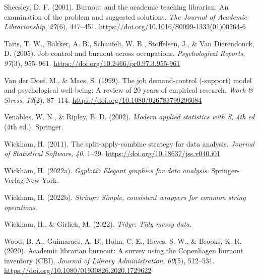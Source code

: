 \documentclass[
  twocolumn]{article}
\newlength{\cslhangindent}
\newenvironment{CSLReferences}[2] %
 {\begin{list}{}{%
  \setlength{\itemindent}{0pt}
  \setlength{\leftmargin}{0pt}
  \setlength{\parsep}{0pt}
  \ifodd #1
   \setlength{\leftmargin}{\cslhangindent}
   \setlength{\itemindent}{-1\cslhangindent}
  \fi
  \setlength{\itemsep}{#2\baselineskip}}}
 {\end{list}}
\begin{document}
\begin{CSLReferences}{1}{0}
Sheesley, D. F. (2001). Burnout and the academic teaching librarian: An
examination of the problem and suggested solutions. \emph{The Journal of
Academic Librarianship}, \emph{27}(6), 447--451.
\url{https://doi.org/10.1016/S0099-1333(01)00264-6}

Taris, T. W., Bakker, A. B., Schaufeli, W. B., Stoffelsen, J., \& Van
Dierendonck, D. (2005). Job control and burnout across occupations.
\emph{Psychological Reports}, \emph{97}(3), 955--961.
\url{https://doi.org/10.2466/pr0.97.3.955-961}

Van der Doef, M., \& Maes, S. (1999). The job demand-control (-support)
model and psychological well-being: A review of 20 years of empirical
research. \emph{Work \& Stress}, \emph{13}(2), 87--114.
\url{https://doi.org/10.1080/026783799296084}

Venables, W. N., \& Ripley, B. D. (2002). \emph{Modern applied
statistics with {S}, 4th ed} (4th ed.). Springer.

Wickham, H. (2011). The split-apply-combine strategy for data analysis.
\emph{Journal of Statistical Software}, \emph{40}, 1--29.
\url{https://doi.org/10.18637/jss.v040.i01}

Wickham, H. (2022a). \emph{Ggplot2: Elegant graphics for data analysis}.
Springer-Verlag New York.

Wickham, H. (2022b). \emph{Stringr: Simple, consistent wrappers for
common string operations}.

Wickham, H., \& Girlich, M. (2022). \emph{Tidyr: Tidy messy data}.

Wood, B. A., Guimaraes, A. B., Holm, C. E., Hayes, S. W., \& Brooks, K.
R. (2020). Academic librarian burnout: A survey using the {Copenhagen}
burnout inventory ({CBI}). \emph{Journal of Library Administration},
\emph{60}(5), 512--531.
\url{https://doi.org/10.1080/01930826.2020.1729622}

\end{CSLReferences}
\end{document}
